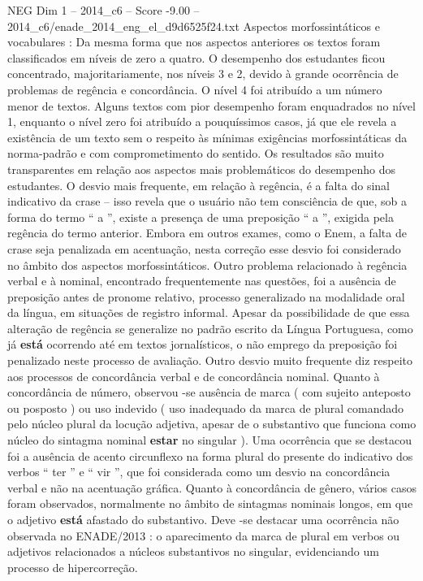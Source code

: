 \begin{textsample}{NEG Dim 1 – 2014\_c6 – Score -9.00 – 2014\_c6/enade\_2014\_eng\_el\_d9d6525f24.txt}
Aspectos morfossintáticos e vocabulares : Da mesma forma que nos aspectos anteriores os textos foram classificados em níveis de zero a quatro.
O desempenho dos estudantes ficou concentrado, majoritariamente, nos níveis 3 e 2, devido à grande ocorrência de problemas de regência e concordância.
O nível 4 foi atribuído a um número menor de textos.
Alguns textos com pior desempenho foram enquadrados no nível 1, enquanto o nível zero foi atribuído a pouquíssimos casos, já que ele revela a existência de um texto sem o respeito às mínimas exigências morfossintáticas da norma-padrão e com comprometimento do sentido.
Os resultados são muito transparentes em relação aos aspectos mais problemáticos do desempenho dos estudantes.
O desvio mais frequente, em relação à regência, é a falta do sinal indicativo da crase – isso revela que o usuário não tem consciência de que, sob a forma do termo “ a ”, existe a presença de uma preposição “ a ”, exigida pela regência do termo anterior.
Embora em outros exames, como o Enem, a falta de crase seja penalizada em acentuação, nesta correção esse desvio foi considerado no âmbito dos aspectos morfossintáticos.
Outro problema relacionado à regência verbal e à nominal, encontrado frequentemente nas questões, foi a ausência de preposição antes de pronome relativo, processo generalizado na modalidade oral da língua, em situações de registro informal.
Apesar da possibilidade de que essa alteração de regência se generalize no padrão escrito da Língua Portuguesa, como já \textbf{está} ocorrendo até em textos jornalísticos, o não emprego da preposição foi penalizado neste processo de avaliação.
Outro desvio muito frequente diz respeito aos processos de concordância verbal e de concordância nominal.
Quanto à concordância de número, observou -se ausência de marca ( com sujeito anteposto ou posposto ) ou uso indevido ( uso inadequado da marca de plural comandado pelo núcleo plural da locução adjetiva, apesar de o substantivo que funciona como núcleo do sintagma nominal \textbf{estar} no singular ).
Uma ocorrência que se destacou foi a ausência de acento circunflexo na forma plural do presente do indicativo dos verbos “ ter ” e “ vir ”, que foi considerada como um desvio na concordância verbal e não na acentuação gráfica.
Quanto à concordância de gênero, vários casos foram observados, normalmente no âmbito de sintagmas nominais longos, em que o adjetivo \textbf{está} afastado do substantivo.
Deve -se destacar uma ocorrência não observada no ENADE/2013 : o aparecimento da marca de plural em verbos ou adjetivos relacionados a núcleos substantivos no singular, evidenciando um processo de hipercorreção.

\end{textsample}
